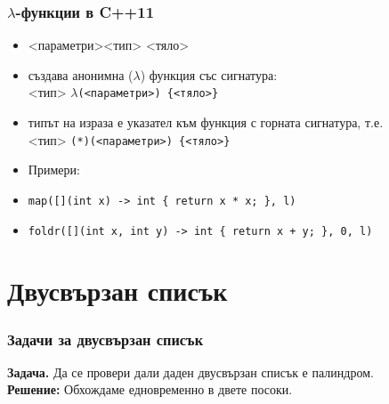 \documentclass{beamer}
\begin{document}
\begin{frame}[fragile]
  \frametitle{$\lambda$-функции в C++11}
  \begin{itemize}[<+->]
  \item \tta{[](}<параметри>\tta{) -> }<тип> \tta{\{}<тяло>\tta{\}}
  \item създава анонимна ($\lambda$) функция със сигнатура:\\
    <тип> $\lambda$\tt(<параметри>\tt{) \{}<тяло>\tt\}
  \item типът на израза е указател към функция с горната сигнатура, т.е.\\
    <тип> \tt{(*)(}<параметри>\tt{) \{}<тяло>\tt\}
  \item Примери:
  \item \verb|map([](int x) -> int { return x * x; }, l)|
  \item \verb|foldr([](int x, int y) -> int { return x + y; }, 0, l)|
  \end{itemize}
\end{frame}

\section{Двусвързан списък}


\begin{frame}
  \frametitle{Задачи за двусвързан списък}

  \textbf{Задача.} Да се провери дали даден двусвързан списък е палиндром.\\[1em]
  \pause
  \textbf{Решение:} Обхождаме едновременно в двете посоки.
\end{frame}
\end{document}
